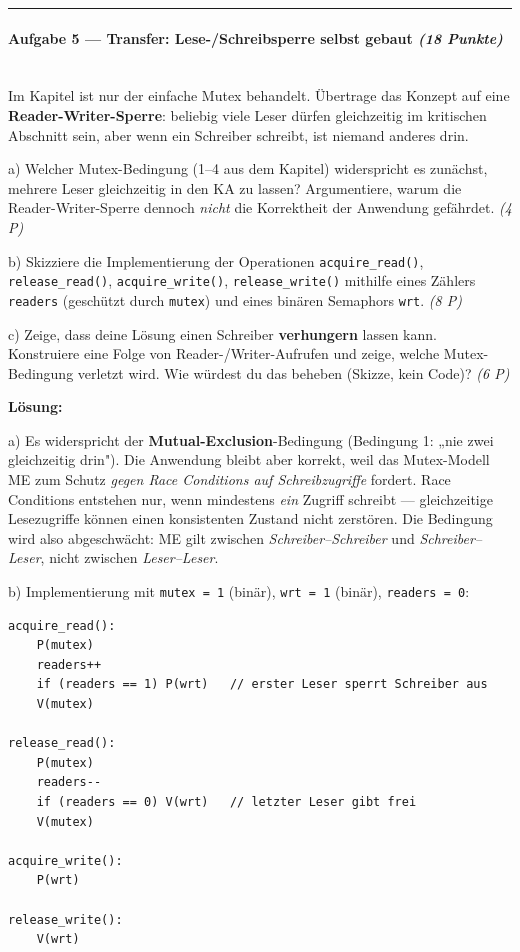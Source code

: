 \documentclass[11pt, a4paper]{article}
\begin{document}
\noindent\textcolor{rulegray}{\rule{\linewidth}{0.4pt}}


\paragraph{Aufgabe 5 — Transfer: Lese-/Schreibsperre selbst gebaut \textit{(18 Punkte)}}\mbox{}\\[2pt]

Im Kapitel ist nur der einfache Mutex behandelt. Übertrage das Konzept auf eine \textbf{Reader-Writer-Sperre}: beliebig viele Leser dürfen gleichzeitig im kritischen Abschnitt sein, aber wenn ein Schreiber schreibt, ist niemand anderes drin.


a) Welcher Mutex-Bedingung (1–4 aus dem Kapitel) widerspricht es zunächst, mehrere Leser gleichzeitig in den KA zu lassen? Argumentiere, warum die Reader-Writer-Sperre dennoch \textit{nicht} die Korrektheit der Anwendung gefährdet. \textit{(4 P)}


b) Skizziere die Implementierung der Operationen \texttt{acquire\_read()}, \texttt{release\_read()}, \texttt{acquire\_write()}, \texttt{release\_write()} mithilfe eines Zählers \texttt{readers} (geschützt durch \texttt{mutex}) und eines binären Semaphors \texttt{wrt}. \textit{(8 P)}


c) Zeige, dass deine Lösung einen Schreiber \textbf{verhungern} lassen kann. Konstruiere eine Folge von Reader-/Writer-Aufrufen und zeige, welche Mutex-Bedingung verletzt wird. Wie würdest du das beheben (Skizze, kein Code)? \textit{(6 P)}


\textbf{Lösung:}


a) Es widerspricht der \textbf{Mutual-Exclusion}-Bedingung (Bedingung 1: „nie zwei gleichzeitig drin"). Die Anwendung bleibt aber korrekt, weil das Mutex-Modell ME zum Schutz \textit{gegen Race Conditions auf Schreibzugriffe} fordert. Race Conditions entstehen nur, wenn mindestens \textit{ein} Zugriff schreibt — gleichzeitige Lesezugriffe können einen konsistenten Zustand nicht zerstören. Die Bedingung wird also abgeschwächt: ME gilt zwischen \textit{Schreiber–Schreiber} und \textit{Schreiber–Leser}, nicht zwischen \textit{Leser–Leser}.


b) Implementierung mit \texttt{mutex = 1} (binär), \texttt{wrt = 1} (binär), \texttt{readers = 0}:


\begin{lstlisting}
acquire_read():
    P(mutex)
    readers++
    if (readers == 1) P(wrt)   // erster Leser sperrt Schreiber aus
    V(mutex)

release_read():
    P(mutex)
    readers--
    if (readers == 0) V(wrt)   // letzter Leser gibt frei
    V(mutex)

acquire_write():
    P(wrt)

release_write():
    V(wrt)
\end{lstlisting}
\end{document}
